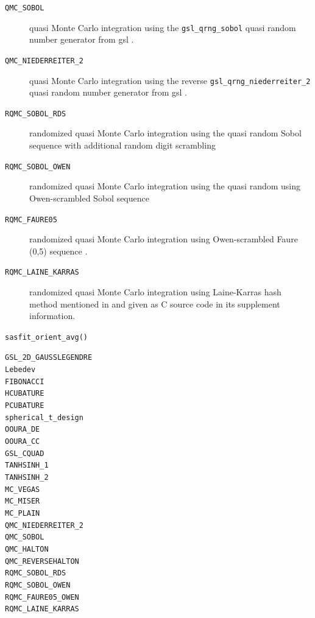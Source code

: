 \begin{description}
   \item[\texttt{QMC\_SOBOL}] quasi Monte Carlo integration \cite{Zaslavsky2023} using the \texttt{gsl\_qrng\_sobol} quasi random number generator from gsl \cite{Galassi2021}.
   \item[\texttt{QMC\_NIEDERREITER\_2}] quasi Monte Carlo integration \cite{Zaslavsky2023} using the reverse \texttt{gsl\_qrng\_niederreiter\_2} quasi random number generator from gsl \cite{Galassi2021}.
   \item[\texttt{RQMC\_SOBOL\_RDS}] randomized quasi Monte Carlo integration using the quasi random Sobol sequence with additional random digit scrambling \cite{Burley2020Scrambling}
   \item[\texttt{RQMC\_SOBOL\_OWEN}] randomized quasi Monte Carlo integration using the quasi random using Owen-scrambled Sobol sequence \cite{Burley2020Scrambling,Owen1995}
   \item[\texttt{RQMC\_FAURE05}] randomized quasi Monte Carlo integration using Owen-scrambled Faure (0,5) sequence \cite{Burley2020Scrambling,Owen1995}.
   \item[\texttt{RQMC\_LAINE\_KARRAS}] randomized quasi Monte Carlo integration using Laine-Karras hash method mentioned in \cite{Burley2020Scrambling} and given as C source code in its supplement information.
\end{description}

\texttt{sasfit\_orient\_avg()}
\begin{description}
\item[\texttt{GSL\_2D\_GAUSSLEGENDRE}]
\item[\texttt{Lebedev}]
\item[\texttt{FIBONACCI}]
\item[\texttt{HCUBATURE}]
\item[\texttt{PCUBATURE}]
\item[\texttt{spherical\_t\_design}]
\item[\texttt{OOURA\_DE}]
\item[\texttt{OOURA\_CC}]
\item[\texttt{GSL\_CQUAD}]
\item[\texttt{TANHSINH\_1}]
\item[\texttt{TANHSINH\_2}]
\item[\texttt{MC\_VEGAS}]
\item[\texttt{MC\_MISER}]
\item[\texttt{MC\_PLAIN}]
\item[\texttt{QMC\_NIEDERREITER\_2}]
\item[\texttt{QMC\_SOBOL}]
\item[\texttt{QMC\_HALTON}]
\item[\texttt{QMC\_REVERSEHALTON}]
\item[\texttt{RQMC\_SOBOL\_RDS}]
\item[\texttt{RQMC\_SOBOL\_OWEN}]
\item[\texttt{RQMC\_FAURE05\_OWEN}]
\item[\texttt{RQMC\_LAINE\_KARRAS}]
\end{description}

